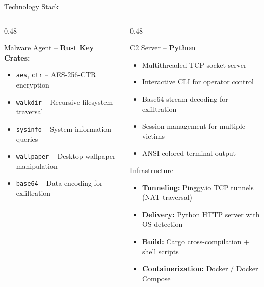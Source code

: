\documentclass[aspectratio=169]{beamer}
\newcommand{\code}[1]{\texttt{\textcolor{primaryblue}{#1}}}
\newcommand{\rustbadge}{\textcolor{rustcolor}{\textbf{Rust}}}
\newcommand{\pythonbadge}{\textcolor{pythoncolor}{\textbf{Python}}}
\begin{document}
\begin{frame}{Technology Stack}
\begin{columns}[T]
\begin{column}{0.48\textwidth}
\begin{exampleblock}{Malware Agent -- \rustbadge}
        \vspace{0.3em}
        \textbf{Key Crates:}
        \begin{itemize}
          \item \code{aes}, \code{ctr} -- AES-256-CTR encryption
          \item \code{walkdir} -- Recursive filesystem traversal
          \item \code{sysinfo} -- System information queries
          \item \code{wallpaper} -- Desktop wallpaper manipulation
          \item \code{base64} -- Data encoding for exfiltration
        \end{itemize}
      \end{exampleblock}
    \end{column}
    \begin{column}{0.48\textwidth}
      \begin{block}{C2 Server -- \pythonbadge}
        \footnotesize
        \begin{itemize}
          \item Multithreaded TCP socket server
          \item Interactive CLI for operator control
          \item Base64 stream decoding for exfiltration
          \item Session management for multiple victims
          \item ANSI-colored terminal output
        \end{itemize}
      \end{block}

      \vspace{0.3em}
      \begin{block}{Infrastructure}
        \footnotesize
        \begin{itemize}
          \item \textbf{Tunneling:} Pinggy.io TCP tunnels (NAT traversal)
          \item \textbf{Delivery:} Python HTTP server with OS detection
          \item \textbf{Build:} Cargo cross-compilation + shell scripts
          \item \textbf{Containerization:} Docker / Docker Compose
        \end{itemize}
      \end{block}
    \end{column}
  \end{columns}
\end{frame}
\end{document}

